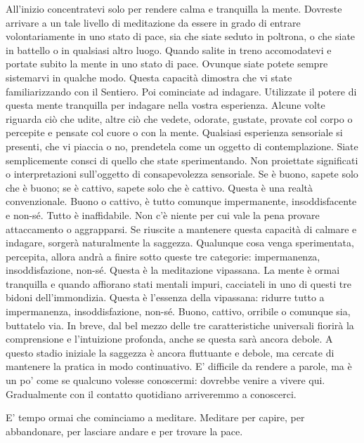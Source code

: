 All'inizio concentratevi solo per rendere calma e tranquilla la mente.
Dovreste arrivare a un tale livello di meditazione da essere in grado di
entrare volontariamente in uno stato di pace, sia che siate seduto in
poltrona, o che siate in battello o in qualsiasi altro luogo. Quando
salite in treno accomodatevi e portate subito la mente in uno stato di
pace. Ovunque siate potete sempre sistemarvi in qualche modo. Questa
capacità dimostra che vi state familiarizzando con il Sentiero. Poi
cominciate ad indagare. Utilizzate il potere di questa mente tranquilla
per indagare nella vostra esperienza. Alcune volte riguarda ciò che
udite, altre ciò che vedete, odorate, gustate, provate col corpo o
percepite e pensate col cuore o con la mente. Qualsiasi esperienza
sensoriale si presenti, che vi piaccia o no, prendetela come un oggetto
di contemplazione. Siate semplicemente consci di quello che state
sperimentando. Non proiettate significati o interpretazioni sull'oggetto
di consapevolezza sensoriale. Se è buono, sapete solo che è buono; se è
cattivo, sapete solo che è cattivo. Questa è una realtà convenzionale.
Buono o cattivo, è tutto comunque impermanente, insoddisfacente e
non-sé. Tutto è inaffidabile. Non c'è niente per cui vale la pena
provare attaccamento o aggrapparsi. Se riuscite a mantenere questa
capacità di calmare e indagare, sorgerà naturalmente la saggezza.
Qualunque cosa venga sperimentata, percepita, allora andrà a finire
sotto queste tre categorie: impermanenza, insoddisfazione, non-sé.
Questa è la meditazione vipassana. La mente è ormai tranquilla e quando
affiorano stati mentali impuri, cacciateli in uno di questi tre bidoni
dell'immondizia. Questa è l'essenza della vipassana: ridurre tutto a
impermanenza, insoddisfazione, non-sé. Buono, cattivo, orribile o
comunque sia, buttatelo via. In breve, dal bel mezzo delle tre
caratteristiche universali fiorirà la comprensione e l'intuizione
profonda, anche se questa sarà ancora debole. A questo stadio iniziale
la saggezza è ancora fluttuante e debole, ma cercate di mantenere la
pratica in modo continuativo. E' difficile da rendere a parole, ma è un
po' come se qualcuno volesse conoscermi: dovrebbe venire a vivere qui.
Gradualmente con il contatto quotidiano arriveremmo a
conoscerci.


E' tempo ormai che cominciamo a meditare. Meditare per capire, per
abbandonare, per lasciare andare e per trovare la pace.

